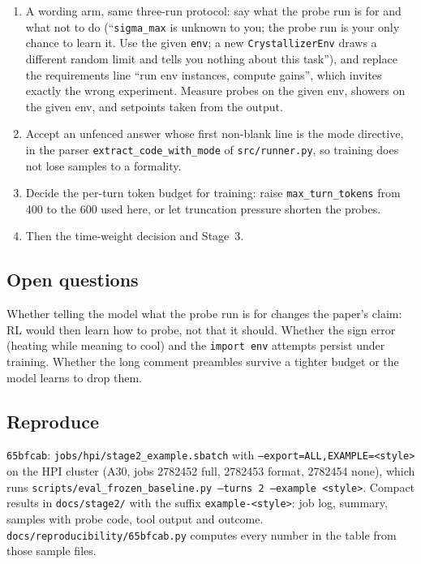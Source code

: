 \documentclass[11pt,a4paper]{article}
\newcommand{\commit}[1]{\texttt{\textcolor{commitgray}{#1}}}
\begin{document}
\begin{enumerate}[nosep]
\item A wording arm, same three-run protocol: say what the probe run is for
  and what not to do (``\texttt{sigma\_max} is unknown to you; the probe run
  is your only chance to learn it. Use the given \texttt{env}; a new
  \texttt{CrystallizerEnv} draws a different random limit and tells you
  nothing about this task''), and replace the requirements line ``run env
  instances, compute gains'', which invites exactly the wrong experiment.
  Measure probes on the given env, showers on the given env, and setpoints
  taken from the output.
\item Accept an unfenced answer whose first non-blank line is the mode
  directive, in the parser \texttt{extract\_code\_with\_mode} of
  \texttt{src/runner.py}, so training does not lose samples to a formality.
\item Decide the per-turn token budget for training: raise
  \texttt{max\_turn\_tokens} from 400 to the 600 used here, or let
  truncation pressure shorten the probes.
\item Then the time-weight decision and Stage~3.
\end{enumerate}

\subsection*{Open questions}

Whether telling the model what the probe run is for changes the paper's
claim: RL would then learn how to probe, not that it should. Whether the sign
error (heating while meaning to cool) and the \texttt{import env} attempts
persist under training. Whether the long comment preambles survive a tighter
budget or the model learns to drop them.

\subsection*{Reproduce}

\begin{sloppypar}
\commit{65bfcab}: \texttt{jobs/hpi/stage2\_example.sbatch} with
\texttt{--export=ALL,EXAMPLE=<style>} on the HPI cluster (A30, jobs 2782452
full, 2782453 format, 2782454 none), which runs
\texttt{scripts/eval\_frozen\_baseline.py --turns 2 --example <style>}.
Compact results in \texttt{docs/stage2/} with the suffix
\texttt{example-<style>}: job log, summary, samples with probe code, tool
output and outcome. \texttt{docs/reproducibility/65bfcab.py} computes every
number in the table from those sample files.
\end{sloppypar}
\end{document}
